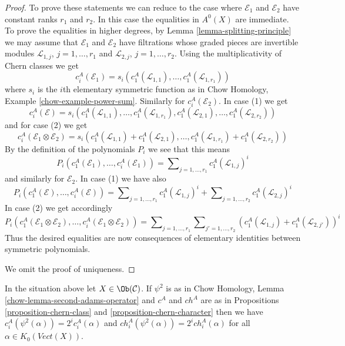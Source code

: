 \begin{proof}
\medskip\noindent
To prove these statements we can reduce to the case where $\mathcal{E}_1$
and $\mathcal{E}_2$ have constant ranks $r_1$ and $r_2$. In this case the
equalities in $A^0(X)$ are immediate. To prove the equalities in higher
degrees, by Lemma \ref{lemma-splitting-principle} we may
assume that $\mathcal{E}_1$ and $\mathcal{E}_2$ have filtrations
whose graded pieces are invertible modules
$\mathcal{L}_{1, j}$, $j = 1, \ldots, r_1$ and
$\mathcal{L}_{2, j}$, $j = 1, \ldots, r_2$.
Using the multiplicativity of Chern classes we get
$$
c_i^A(\mathcal{E}_1) =
s_i(c_1^A(\mathcal{L}_{1, 1}), \ldots, c_1^A(\mathcal{L}_{1, r_1}))
$$
where $s_i$ is the $i$th elementary symmetric function as in
Chow Homology, Example \ref{chow-example-power-sum}.
Similarly for $c_i^A(\mathcal{E}_2)$. In case (1) we get
$$
c_i^A(\mathcal{E}) =
s_i(c_1^A(\mathcal{L}_{1, 1}), \ldots, c_1^A(\mathcal{L}_{1, r_1}),
c_1^A(\mathcal{L}_{2, 1}), \ldots, c_1^A(\mathcal{L}_{2, r_2}))
$$
and for case (2) we get
$$
c_i^A(\mathcal{E}_1 \otimes \mathcal{E}_2) =
s_i(c_1^A(\mathcal{L}_{1, 1}) + c_1^A(\mathcal{L}_{2, 1}),
\ldots, c_1^A(\mathcal{L}_{1, r_1}) + c_1^A(\mathcal{L}_{2, r_2}))
$$
By the definition of the polynomials $P_i$ we see that this means
$$
P_i(c^A_1(\mathcal{E}_1), \ldots, c^A_i(\mathcal{E}_1)) =
\sum\nolimits_{j = 1, \ldots, r_1} c_1^A(\mathcal{L}_{1, j})^i
$$
and similarly for $\mathcal{E}_2$. In case (1) we have also
$$
P_i(c^A_1(\mathcal{E}), \ldots, c^A_i(\mathcal{E})) =
\sum\nolimits_{j = 1, \ldots, r_1} c_1^A(\mathcal{L}_{1, j})^i +
\sum\nolimits_{j = 1, \ldots, r_2} c_1^A(\mathcal{L}_{2, j})^i
$$
In case (2) we get accordingly
$$
P_i(c^A_1(\mathcal{E}_1 \otimes \mathcal{E}_2), \ldots,
c^A_i(\mathcal{E}_1 \otimes \mathcal{E}_2)) =
\sum\nolimits_{j = 1, \ldots, r_1}
\sum\nolimits_{j' = 1, \ldots, r_2}
(c_1^A(\mathcal{L}_{1, j}) + c_1^A(\mathcal{L}_{2, j'}))^i
$$
Thus the desired equalities are now consequences of elementary
identities between symmetric polynomials.

\medskip\noindent
We omit the proof of uniqueness.
\end{proof}

\begin{lemma}
\label{lemma-adams-and-chern}
In the situation above let $X \in \Ob(\mathcal{C})$.
If $\psi^2$ is as in
Chow Homology, Lemma \ref{chow-lemma-second-adams-operator}
and $c^A$ and $ch^A$ are as in
Propositions \ref{proposition-chern-class} and
\ref{proposition-chern-character}
then we have $c^A_i(\psi^2(\alpha)) = 2^i c^A_i(\alpha)$ and
$ch^A_i(\psi^2(\alpha)) = 2^i ch^A_i(\alpha)$
for all $\alpha \in K_0(\textit{Vect}(X))$.
\end{lemma}

